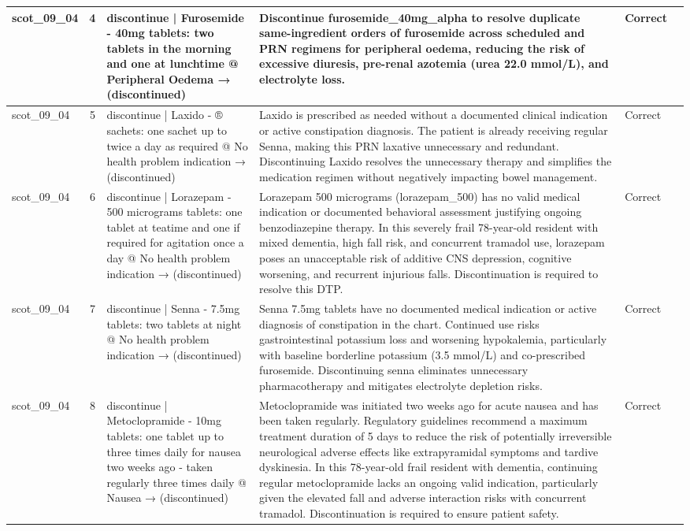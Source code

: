 \begin{longtable}{|p{1.45cm}|c|p{3.3cm}|p{6.5cm}|p{1.55cm}|p{2.3cm}|}
\hline
scot\_09\_04 & 4 & discontinue | Furosemide - 40mg tablets: two tablets in the morning and one at lunchtime @ Peripheral Oedema → (discontinued) & Discontinue furosemide\_40mg\_alpha to resolve duplicate same-ingredient orders of furosemide across scheduled and PRN regimens for peripheral oedema, reducing the risk of excessive diuresis, pre-renal azotemia (urea 22.0 mmol/L), and electrolyte loss. & Correct &  \\
\hline
scot\_09\_04 & 5 & discontinue | Laxido - ® sachets: one sachet up to twice a day as required @ No health problem indication → (discontinued) & Laxido is prescribed as needed without a documented clinical indication or active constipation diagnosis. The patient is already receiving regular Senna, making this PRN laxative unnecessary and redundant. Discontinuing Laxido resolves the unnecessary therapy and simplifies the medication regimen without negatively impacting bowel management. & Correct &  \\
\hline
scot\_09\_04 & 6 & discontinue | Lorazepam - 500 micrograms tablets: one tablet at teatime and one if required for agitation once a day @ No health problem indication → (discontinued) & Lorazepam 500 micrograms (lorazepam\_500) has no valid medical indication or documented behavioral assessment justifying ongoing benzodiazepine therapy. In this severely frail 78-year-old resident with mixed dementia, high fall risk, and concurrent tramadol use, lorazepam poses an unacceptable risk of additive CNS depression, cognitive worsening, and recurrent injurious falls. Discontinuation is required to resolve this DTP. & Correct &  \\
\hline
scot\_09\_04 & 7 & discontinue | Senna - 7.5mg tablets: two tablets at night @ No health problem indication → (discontinued) & Senna 7.5mg tablets have no documented medical indication or active diagnosis of constipation in the chart. Continued use risks gastrointestinal potassium loss and worsening hypokalemia, particularly with baseline borderline potassium (3.5 mmol/L) and co-prescribed furosemide. Discontinuing senna eliminates unnecessary pharmacotherapy and mitigates electrolyte depletion risks. & Correct &  \\
\hline
scot\_09\_04 & 8 & discontinue | Metoclopramide - 10mg tablets: one tablet up to three times daily for nausea two weeks ago - taken regularly three times daily @ Nausea → (discontinued) & Metoclopramide was initiated two weeks ago for acute nausea and has been taken regularly. Regulatory guidelines recommend a maximum treatment duration of 5 days to reduce the risk of potentially irreversible neurological adverse effects like extrapyramidal symptoms and tardive dyskinesia. In this 78-year-old frail resident with dementia, continuing regular metoclopramide lacks an ongoing valid indication, particularly given the elevated fall and adverse interaction risks with concurrent tramadol. Discontinuation is required to ensure patient safety. & Correct &  \\

\end{longtable}
